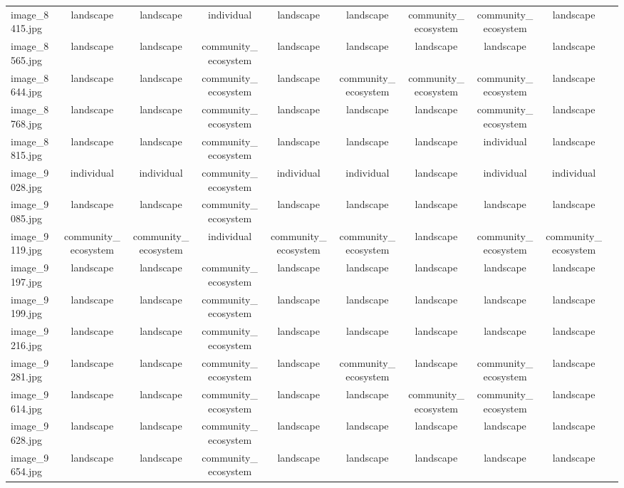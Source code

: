 \documentclass[hidelinks, 11pt]{article}
\begin{document}
\begin{longtable}{@{}lccccccccc@{}}
image\_8415.jpg  & landscape & landscape & individual & landscape & landscape & community\_ecosystem & community\_ecosystem & landscape \\
image\_8565.jpg  & landscape & landscape & community\_ecosystem & landscape & landscape & landscape & landscape & landscape \\
image\_8644.jpg  & landscape & landscape & community\_ecosystem & landscape & community\_ecosystem & community\_ecosystem & community\_ecosystem & landscape \\
image\_8768.jpg  & landscape & landscape & community\_ecosystem & landscape & landscape & landscape & community\_ecosystem & landscape \\
image\_8815.jpg  & landscape & landscape & community\_ecosystem & landscape & landscape & landscape & individual & landscape \\
image\_9028.jpg  & individual & individual & community\_ecosystem & individual & individual & landscape & individual & individual \\
image\_9085.jpg  & landscape & landscape & community\_ecosystem & landscape & landscape & landscape & landscape & landscape \\
image\_9119.jpg  & community\_ecosystem & community\_ecosystem & individual & community\_ecosystem & community\_ecosystem & landscape & community\_ecosystem & community\_ecosystem \\
image\_9197.jpg  & landscape & landscape & community\_ecosystem & landscape & landscape & landscape & landscape & landscape \\
image\_9199.jpg  & landscape & landscape & community\_ecosystem & landscape & landscape & landscape & landscape & landscape \\
image\_9216.jpg  & landscape & landscape & community\_ecosystem & landscape & landscape & landscape & landscape & landscape \\
image\_9281.jpg  & landscape & landscape & community\_ecosystem & landscape & community\_ecosystem & landscape & community\_ecosystem & landscape \\
image\_9614.jpg  & landscape & landscape & community\_ecosystem & landscape & landscape & community\_ecosystem & community\_ecosystem & landscape \\
image\_9628.jpg  & landscape & landscape & community\_ecosystem & landscape & landscape & landscape & landscape & landscape \\
image\_9654.jpg  & landscape & landscape & community\_ecosystem & landscape & landscape & landscape & landscape & landscape \\

\end{longtable}
\end{document}
